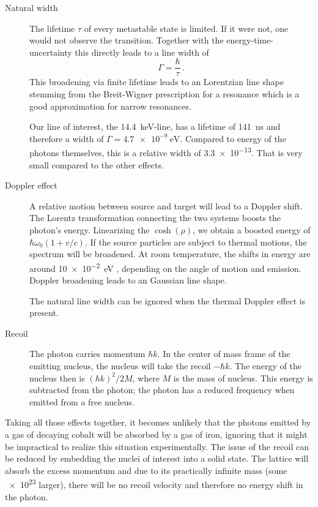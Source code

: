 \documentclass[11pt, english, fleqn, DIV=15, headinclude, BCOR=2cm]{scrreprt}
\begin{document}
\begin{description}
    \item[Natural width]
        The lifetime $\tau$ of every metastable state is limited. If it were
        not, one would not observe the transition. Together with the
        energy-time-uncertainty this directly leads to a line width of
        \[
            \Gamma = \frac\hbar\tau \,.
        \]
        This broadening via finite lifetime leads to an Lorentzian line shape
        stemming from the Breit-Wigner prescription for a resonance which is a
        good approximation for narrow resonances.

        Our line of interest, the \SI{14.4}{\kilo\electronvolt}-line, has a
        lifetime of \SI{141}{\nano\second} and therefore a width of $\Gamma =
        \SI{4.7e-9}{\electronvolt}$. Compared to energy of the photons
        themselves, this is a relative width of \num{3.3e-13}. That is very
        small compared to the other effects.
        \parencite[42]{Schatz/Nukleare_Festkoerperphysik}

    \item[Doppler effect]
        A relative motion between source and target will lead to a Doppler
        shift. The Lorentz transformation connecting the two systems boosts the
        photon's energy. Linearizing the $\cosh(\rho)$, we obtain a boosted
        energy of $\hbar\omega_0(1 + v/c)$. If the source particles are subject
        to thermal motions, the spectrum will be broadened. At room
        temperature, the shifts in energy are around \SI{10e-2}{\electronvolt}
        \parencite[43]{Schatz/Nukleare_Festkoerperphysik}, depending on the
        angle of motion and emission. Doppler broadening leads to an Gaussian
        line shape.

        The natural line width can be ignored when the thermal Doppler effect
        is present.

    \item[Recoil]
        The photon carries momentum $\hbar k$. In the center of mass frame of
        the emitting nucleus, the nucleus will take the recoil $- \hbar k$. The
        energy of the nucleus then is $(\hbar k)^2/2 M$, where $M$ is the mass
        of nucleus. This energy is subtracted from the photon; the photon has a
        reduced frequency when emitted from a free nucleus.
\end{description}

Taking all those effects together, it becomes unlikely that the photons emitted
by a gas of decaying cobalt will be absorbed by a gas of iron, ignoring that it
might be impractical to realize this situation experimentally. The issue of the
recoil can be reduced by embedding the nuclei of interest into a solid state.
The lattice will absorb the excess momentum and due to its practically infinite
mass (some \num{e23} larger), there will be no recoil velocity and therefore no
energy shift in the photon.
\end{document}
